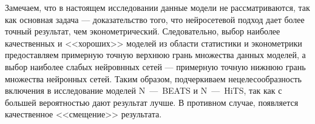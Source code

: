 Замечаем, что в настоящем исследовании данные модели не рассматриваются, так как основная задача --- доказательство того, что нейросетевой подход дает более точный результат, чем эконометрический. Следовательно, выбор наиболее качественных и <<хороших>> моделей из области статистики и эконометрики предоставляем примерную точную верхнюю грань множества данных моделей, а выбор наиболее слабых нейровнных сетей --- примерную точную нижнюю грань множества нейронных сетей. Таким образом, подчеркиваем нецелесообразность включения в исследование моделей N~---~BEATS и N~---~HiTS, так как с большей вероятностью дают результат лучше. В противном случае, появляется качественное <<смещение>> результата.



